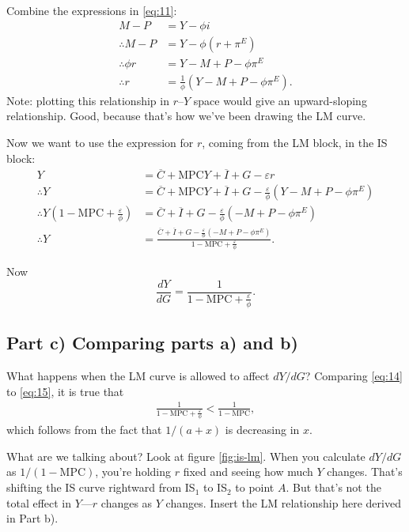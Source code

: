 \documentclass[12pt]{pracjourn_rwr}
\theoremstyle{definition}
\theoremstyle{remark}
\begin{document}
Combine the expressions in \eqref{eq:11}:
\begin{align*}
M - P &= Y - \phi i \\
\therefore M - P &= Y - \phi \left( r + \pi^{E} \right) \\
\therefore \phi r &= Y - M + P - \phi \pi^{E} \\
\therefore r &= \frac{1}{\phi} \left( Y - M + P - \phi \pi^{E} \right).
\end{align*}
Note: plotting this relationship in $r$--$Y$ space would give an upward-sloping relationship.
Good, because that's how we've been drawing the LM curve.

Now we want to use the expression for $r$, coming from the LM block,
in the IS block:
\begin{align*}
Y &= \overline{C} + \text{MPC} Y + \overline{I} + G - \varepsilon r \\
\therefore Y &=
\overline{C} + \text{MPC} Y + \overline{I} + G - \frac{\varepsilon}{\phi} \left( Y - M + P - \phi \pi^{E} \right) \\
\therefore Y \left( 1 - \text{MPC} + \frac{\varepsilon}{\phi} \right) &=
\overline{C} + \overline{I} + G - \frac{\varepsilon}{\phi} \left(- M + P - \phi \pi^{E} \right) \\
\therefore Y &= \frac{\overline{C} + \overline{I} + G - \frac{\varepsilon}{\phi} \left(- M + P - \phi \pi^{E} \right)}{1 - \text{MPC} + \frac{\varepsilon}{\phi}}.
\end{align*}

Now
\begin{equation}
\label{eq:15}
\frac{d Y}{d G} = \frac{1}{1 - \text{MPC} + \frac{\varepsilon}{\phi}}.
\end{equation}

\subsection{Part c) Comparing parts a) and b)}

What happens when the LM curve is allowed to affect $dY / dG$?
Comparing \eqref{eq:14} to \eqref{eq:15}, it is true that
\begin{align*}
\frac{1}{1 - \text{MPC} + \frac{\varepsilon}{\phi}} < \frac{1}{1-\text{MPC}},
\end{align*}
which follows from the fact that $1 / (a +x)$ is decreasing in $x$.

What are we talking about?
Look at figure \ref{fig:is-lm}.
When you calculate $d Y/ dG$ as $1/(1-\text{MPC})$,
you're holding $r$ fixed and seeing how much $Y$ changes.
That's shifting the IS curve rightward from IS$_{1}$ to IS$_{2}$ to point $A$.
But that's not the total effect in $Y$---$r$ changes as $Y$ changes.
Insert the LM relationship here derived in Part b).
\end{document}
